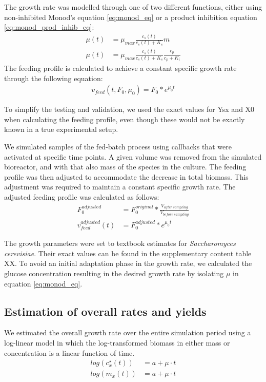 \documentclass{bioinfo}
\begin{document}
\begin{methods}
The growth rate was modelled through one of two different functions, either using non-inhibited Monod's equation \ref{eq:monod_eq} or a product inhibition equation \ref{eq:monod_prod_inhib_eq}:
\begin{align}
\mu(t) &= \mu_{max}\frac{c_{s}(t)}{c_{s}(t) + K_{s}} m\label{eq:monod_eq} \\ 
\mu(t) &= \mu_{max}\frac{c_{s}(t)}{c_{s}(t) + K_{s}}\frac{c_{p}}{c_{p} + K_{i}} \label{eq:monod_prod_inhib_eq}
\end{align} 
The feeding profile is calculated to achieve a constant specific growth rate through the following equation:
\begin{align}
v_{feed}(t, F_0, \mu_0) = F_0 * e^{\mu_0 t}
\end{align}

To simplify the testing and validation, we used the exact values for Ysx and X0 when calculating the feeding profile, even though these would not be exactly known in a true experimental setup.

We simulated samples of the fed-batch process using callbacks that were activated at specific time points. A given volume was removed from the simulated bioreactor, and with that also mass of the species in the culture. The feeding profile was then adjusted to accommodate the decrease in total biomass. This adjustment was required to maintain a constant specific growth rate. The adjusted feeding profile was calculated as follows:
\begin{align}
    F_{0}^{adjusted} &= F_{0}^{original} * \frac{V_{after \: sampling}}{V_{before \: sampling}} \\
    v_{feed}^{adjusted}(t) &= F_{0}^{adjusted} * e^{\mu_0 t}
\end{align}
    
The growth parameters were set to textbook estimates for \textit{Saccharomyces cerevisiae}. Their exact values can be found in the supplementary content table XX. To avoid an initial adaptation phase in the growth rate, we calculated the glucose concentration resulting in the desired growth rate by isolating $\mu$ in equation \ref{eq:monod_eq}.

\subsection{Estimation of overall rates and yields}
We estimated the overall growth rate over the entire simulation period using a log-linear model in which the log-transformed biomass in either mass or concentration is a linear function of time.
\begin{align}
    log(c^{\star}_x(t)) &= a + \mu \cdot t \\
    log(m_x(t)) &= a + \mu \cdot t    
\end{align}


\end{methods}
\end{document}
